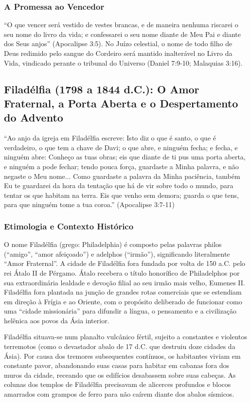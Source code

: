 \documentclass[11pt,a4paper,openany]{book}
\begin{document}
\subsubsection*{A Promessa ao Vencedor}
``O que vencer será vestido de vestes brancas, e de maneira nenhuma riscarei o seu nome do livro da vida; e confessarei o seu nome diante de Meu Pai e diante dos Seus anjos'' (Apocalipse 3:5). No Juízo celestial, o nome de todo filho de Deus redimido pelo sangue do Cordeiro será mantido inalterável no Livro da Vida, vindicado perante o tribunal do Universo (Daniel 7:9-10; Malaquias 3:16).



\subsection{Filadélfia (1798 a 1844 d.C.): O Amor Fraternal, a Porta Aberta e o Despertamento do Advento}


``Ao anjo da igreja em Filadélfia escreve: Isto diz o que é santo, o que é verdadeiro, o que tem a chave de Davi; o que abre, e ninguém fecha; e fecha, e ninguém abre: Conheço as tuas obras; eis que diante de ti pus uma porta aberta, e ninguém a pode fechar; tendo pouca força, guardaste a Minha palavra, e não negaste o Meu nome... Como guardaste a palavra da Minha paciência, também Eu te guardarei da hora da tentação que há de vir sobre todo o mundo, para tentar os que habitam na terra. Eis que venho sem demora; guarda o que tens, para que ninguém tome a tua coroa.'' (Apocalipse 3:7-11)


\subsubsection*{Etimologia e Contexto Histórico}
O nome Filadélfia (grego: Philadelphia) é composto pelas palavras philos (``amigo'', ``amor afeiçoado'') e adelphos (``irmão''), significando literalmente ``Amor Fraternal''. A cidade de Filadélfia fora fundada por volta de 150 a.C. pelo rei Átalo II de Pérgamo. Átalo recebera o título honorífico de Philadelphos por sua extraordinária lealdade e devoção filial ao seu irmão mais velho, Eumenes II. Filadélfia fora plantada na junção de grandes rotas comerciais que se estendiam em direção à Frígia e ao Oriente, com o propósito deliberado de funcionar como uma ``cidade missionária'' para difundir a língua, o pensamento e a civilização helênica aos povos da Ásia interior.

Filadélfia situava-se num planalto vulcânico fértil, sujeito a constantes e violentos terremotos (como o devastador abalo de 17 d.C. que destruiu doze cidades da Ásia). Por causa dos tremores subsequentes contínuos, os habitantes viviam em constante pavor, abandonando suas casas para habitar em cabanas fora dos muros da cidade, receando que os edifícios desabassem sobre suas cabeças. As colunas dos templos de Filadélfia precisavam de alicerces profundos e blocos amarrados com grampos de ferro para não caírem diante dos abalos sísmicos.
\end{document}
